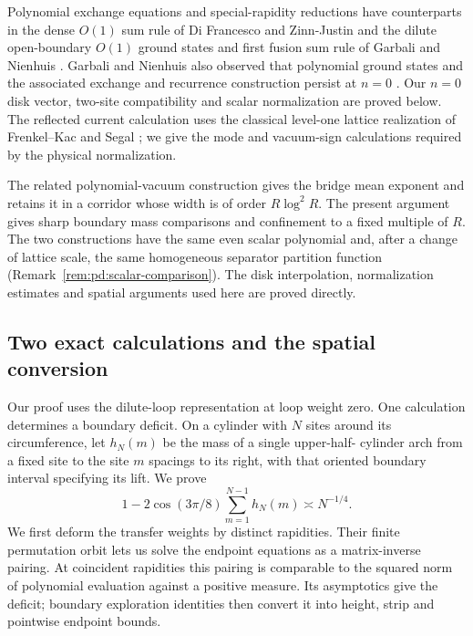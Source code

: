 Polynomial exchange equations and special-rapidity reductions have
counterparts in the dense $O(1)$ sum rule of Di Francesco and Zinn-Justin
\cite{DiFrancescoZinnJustin2005} and the dilute open-boundary $O(1)$
ground states and first fusion sum rule of Garbali and Nienhuis
\cite{GarbaliNienhuis2017Ground,GarbaliNienhuis2017Sum}.
Garbali and Nienhuis also observed that polynomial ground states and
the associated exchange and recurrence construction persist at $n=0$
\cite[Section~4]{GarbaliNienhuis2017Ground}.
Our $n=0$ disk vector, two-site compatibility and scalar normalization
are proved below. The reflected current calculation uses the classical
level-one lattice realization of Frenkel--Kac and Segal
\cite{FrenkelKac1980,Segal1981,Frenkel1985}; we give the mode and
vacuum-sign calculations required by the physical normalization.

The related polynomial-vacuum construction
\cite[Theorem~1.1]{PolynomialVacuumCompanion} gives the bridge mean exponent and
retains it in a corridor whose width is of order $R\log^2R$. The present argument gives
sharp boundary mass comparisons and confinement to a fixed multiple
of $R$. The two constructions have the same even scalar polynomial and,
after a change of lattice scale, the same homogeneous separator
partition function (Remark~\ref{rem:pd:scalar-comparison}).
The disk interpolation, normalization estimates and spatial arguments
used here are proved directly.

\subsection{Two exact calculations and the spatial conversion}
Our proof uses the dilute-loop representation at loop weight zero. One
calculation determines a boundary deficit. On a cylinder with $N$ sites
around its circumference, let $h_N(m)$ be the mass of a single upper-half-
cylinder arch from a fixed site to the site $m$ spacings to its right,
with that oriented boundary interval specifying its lift. We prove
\[
 1-2\cos(3\pi/8)\sum_{m=1}^{N-1}h_N(m)\asymp N^{-1/4}.
\]
We first deform the transfer weights by distinct rapidities. Their finite
permutation orbit lets us solve the endpoint equations as a matrix-inverse
pairing. At coincident rapidities this pairing is comparable to the squared norm
of polynomial evaluation against a positive measure. Its asymptotics give the deficit;
boundary exploration identities then convert it into height, strip and
pointwise endpoint bounds.

